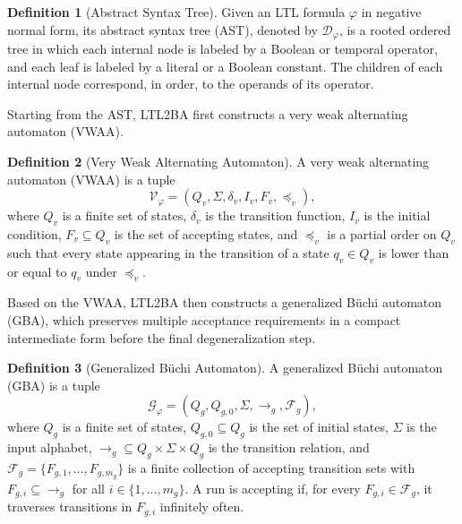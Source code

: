 \documentclass[lettersize,journal]{IEEEtran}
\theoremstyle{italiclemma}
\theoremstyle{italiclemma}
\theoremstyle{definition}
\newtheorem{definition}{Definition}
\begin{document}
\begin{definition}[Abstract Syntax Tree\cite{Gastin2001FastLT,2006Compilers}] Given an LTL formula $\varphi$ in negative normal form, its abstract syntax tree (AST), denoted by $\mathcal{D}_\varphi$, is a rooted ordered tree in which each internal node is labeled by a Boolean or temporal operator, and each leaf is labeled by a literal or a Boolean constant. The children of each internal node correspond, in order, to the operands of its operator. \end{definition}

Starting from the AST, LTL2BA first constructs a very weak alternating automaton (VWAA). 

\begin{definition}[Very Weak Alternating Automaton]
A very weak alternating automaton (VWAA) is a tuple
\[
\mathcal{V}_\varphi=(Q_v,\Sigma,\delta_v,I_v,F_v,\preceq_v),
\]
where $Q_v$ is a finite set of states, $\delta_v$ is the transition function, $I_v$ is the initial condition, $F_v \subseteq Q_v$ is the set of accepting states, and $\preceq_v$ is a partial order on $Q_v$ such that every state appearing in the transition of a state $q_v \in Q_v$ is lower than or equal to $q_v$ under $\preceq_v$.
\end{definition}

Based on the VWAA, LTL2BA then constructs a generalized Büchi automaton (GBA), which preserves multiple acceptance requirements in a compact intermediate form before the final degeneralization step.

\begin{definition}[Generalized Büchi Automaton]
A generalized Büchi automaton (GBA) is a tuple
\[
\mathcal{G}_\varphi=(Q_g,Q_{g,0},\Sigma,\rightarrow_g,\mathcal{F}_g),
\]
where $Q_g$ is a finite set of states, $Q_{g,0} \subseteq Q_g$ is the set of initial states, $\Sigma$ is the input alphabet, $\rightarrow_g \subseteq Q_g \times \Sigma \times Q_g$ is the transition relation, and
$\mathcal{F}_g=\{F_{g,1},\dots,F_{g,m_g}\}$
is a finite collection of accepting transition sets with $F_{g,i} \subseteq \rightarrow_g$ for all $i \in \{1,\dots,m_g\}$. A run is accepting if, for every $F_{g,i} \in \mathcal{F}_g$, it traverses transitions in $F_{g,i}$ infinitely often.
\end{definition}
\end{document}
